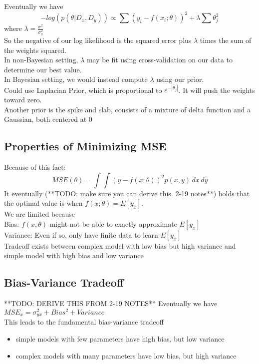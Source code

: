 \documentclass[11pt,psfig]{article}
\begin{document}
Eventually we have
\[
-log(p(\theta|D_x,D_y)) \propto \sum{(y_i - f(x_i;\theta))^2} + \lambda \sum{\theta_j^2}
\]
where $\lambda = \frac{\sigma^2}{\sigma_0^2}$\\
So the negative of our log likelihood is the squared error plus $\lambda$ times the sum of the weights squared. \\
In non-Bayesian setting, $\lambda$ may be fit using cross-validation on our data to determine our best value. 
\\
In Bayesian setting, we would instead compute $\lambda$ using our prior. 
\\
Could use Laplacian Prior, which is proportional to $e^{-|\theta_j|}$. It will push the weights toward zero.\\
Another prior is the spike and slab, consists of a mixture of delta function and a Gaussian, both centered at 0

\subsection*{Properties of Minimizing MSE}

Because of this fact:
\[
MSE(\theta) = \int{\int{(y-f(x;\theta))^2 p(x,y)\,dx}\,dy}
\]
It eventually (**TODO: make sure you can derive this. 2-19 notes**) holds that the optimal value is when $f(x;\theta)=E[y_x]$. \\
We are limited because\\
Bias: $f(x,\theta)$ might not be able to exactly approximate $E[y_x]$\\
Variance: Even if so, only have finite data to learn $E[y_x]$\\
Tradeoff exists between complex model with low bias but high variance and \\
simple model with high bias and low variance

\subsection*{Bias-Variance Tradeoff}

**TODO: DERIVE THIS FROM 2-19 NOTES**
Eventually we have $MSE_x = \sigma_{yx}^2 + Bias^2 + Variance$\\
This leads to the fundamental bias-variance tradeoff
\begin{itemize}
\item simple models with few parameters have high bias, but low variance
\item complex models with many parameters have low bias, but high variance
\end{itemize}
\end{document}
